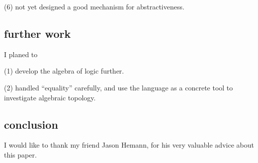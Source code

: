 \documentclass{sigplanconf}
\begin{document}
(6) not yet designed a good mechanism for abstractiveness.

\subsection{further work}

I planed to

(1) develop the algebra of logic further.

(2) handled ``equality'' carefully,
and use the language as a concrete tool
to investigate algebraic topology.

\subsection{conclusion}

\acks

I would like to thank my friend Jason Hemann, for his very valuable advice about this paper.



\begin{thebibliography}{}
  \softraggedright

\end{thebibliography}
\end{document}

